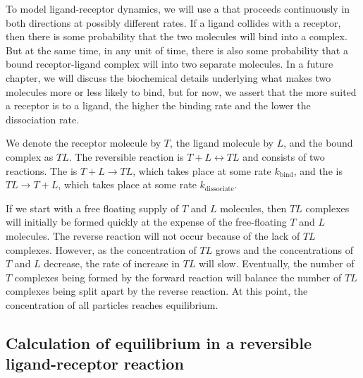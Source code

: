 To model ligand-receptor dynamics, we will use a  that proceeds continuously in both directions at possibly different rates. If a ligand collides with a receptor, then there is some probability that the two molecules will bind into a complex. But at the same time, in any unit of time, there is also some probability that a bound receptor-ligand complex will  into two separate molecules. In a future chapter, we will discuss the biochemical details underlying what makes two molecules more or less likely to bind, but for now, we assert that the more suited a receptor is to a ligand, the higher the binding rate and the lower the dissociation rate.\\

\begin{note}\end{note}

We denote the receptor molecule by $T$, the ligand molecule by $L$, and the bound complex as $TL$. The reversible reaction is $T + L \longleftrightarrow TL$ and consists of two reactions. The  is $T + L \rightarrow TL$, which takes place at some rate $k_\text{bind}$, and the  is $TL \rightarrow T + L$, which takes place at some rate $k_\text{dissociate}$.

If we start with a free floating supply of $T$ and $L$ molecules, then $TL$ complexes will initially be formed quickly at the expense of the free-floating $T$ and $L$ molecules. The reverse reaction will not occur because of the lack of $TL$ complexes. However, as the concentration of $TL$ grows and the concentrations of $T$ and $L$ decrease, the rate of increase in $TL$ will slow. Eventually, the number of $T$ complexes being formed by the forward reaction will balance the number of $TL$ complexes being split apart by the reverse reaction. At this point, the concentration of all particles reaches equilibrium.

\FloatBarrier
{}
\subsection{Calculation of equilibrium in a reversible ligand-receptor reaction}

